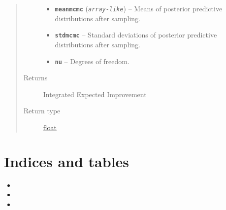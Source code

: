\documentclass[letterpaper,10pt,english]{sphinxmanual}
\begin{document}
\begin{fulllineitems}
\begin{fulllineitems}
\begin{quote}
\begin{description}
\begin{itemize}
\item {} 
\textbf{\texttt{meanmcmc}} (\emph{\texttt{array-like}}) -- Means of posterior predictive distributions after sampling.

\item {} 
\textbf{\texttt{stdmcmc}} -- Standard deviations of posterior predictive distributions after sampling.

\item {} 
\textbf{\texttt{nu}} -- Degrees of freedom.

\end{itemize}

\item[{Returns}] \leavevmode
Integrated Expected Improvement

\item[{Return type}] \leavevmode
\href{https://docs.python.org/2/library/functions.html\#float}{float}

\end{description}\end{quote}

\end{fulllineitems}


\end{fulllineitems}



\chapter{Indices and tables}
\label{index:indices-and-tables}\begin{itemize}
\item {} 

\item {} 

\item {} 

\end{itemize}
\end{document}
